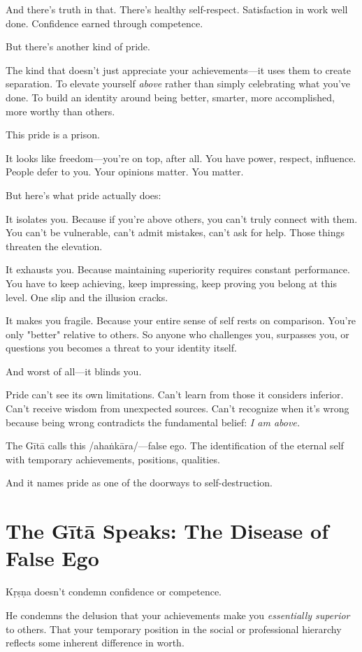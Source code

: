 \documentclass[11pt,twoside]{book}
\begin{document}
And there's truth in that. There's healthy self-respect. Satisfaction in work well done. Confidence earned through competence.

But there's another kind of pride.

The kind that doesn't just appreciate your achievements—it uses them to create separation. To elevate yourself \emph{above} rather than simply celebrating what you've done. To build an identity around being better, smarter, more accomplished, more worthy than others.

This pride is a prison.

It looks like freedom—you're on top, after all. You have power, respect, influence. People defer to you. Your opinions matter. You matter.

But here's what pride actually does:

It isolates you. Because if you're above others, you can't truly connect with them. You can't be vulnerable, can't admit mistakes, can't ask for help. Those things threaten the elevation.

It exhausts you. Because maintaining superiority requires constant performance. You have to keep achieving, keep impressing, keep proving you belong at this level. One slip and the illusion cracks.

It makes you fragile. Because your entire sense of self rests on comparison. You're only "better" relative to others. So anyone who challenges you, surpasses you, or questions you becomes a threat to your identity itself.

And worst of all—it blinds you.

Pride can't see its own limitations. Can't learn from those it considers inferior. Can't receive wisdom from unexpected sources. Can't recognize when it's wrong because being wrong contradicts the fundamental belief: \emph{I am above.}

The Gītā calls this /ahaṅkāra/—false ego. The identification of the eternal self with temporary achievements, positions, qualities.

And it names pride as one of the doorways to self-destruction.

\section*{The Gītā Speaks: The Disease of False Ego}

Kṛṣṇa doesn't condemn confidence or competence.

He condemns the delusion that your achievements make you \emph{essentially superior} to others. That your temporary position in the social or professional hierarchy reflects some inherent difference in worth.
\end{document}
